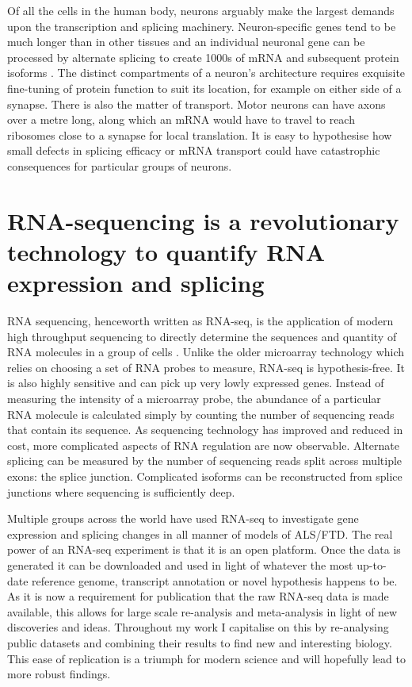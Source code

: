 Of all the cells in the human body, neurons arguably make the largest demands upon the transcription and splicing machinery. Neuron-specific genes tend to be much longer than in other tissues \citep{Sibley2015} and an individual neuronal gene can be processed by alternate splicing to create 1000s of mRNA and subsequent protein isoforms \citep{Treutlein2014}. The distinct compartments of a neuron's architecture requires exquisite fine-tuning of protein function to suit its location, for example on either side of a synapse. There is also the matter of transport. Motor neurons can have axons over a metre long, along which an mRNA would have to travel to reach ribosomes close to a synapse for local translation. It is easy to hypothesise how small defects in splicing efficacy or mRNA transport could have catastrophic consequences for particular groups of neurons. 



\section{RNA-sequencing is a revolutionary technology to quantify RNA expression and splicing} %

RNA sequencing, henceworth written as RNA-seq, is the application of modern high throughput sequencing to directly determine the sequences and quantity of RNA molecules in a group of cells \citep{Wang2009}. Unlike the older microarray technology which relies on choosing a set of RNA probes to measure, RNA-seq is hypothesis-free. It is also highly sensitive and can pick up very lowly expressed genes. Instead of measuring the intensity of a microarray probe, the abundance of a particular RNA molecule is calculated simply by counting the number of sequencing reads that contain its sequence. As sequencing technology has improved and reduced in cost, more complicated aspects of RNA regulation are now observable. Alternate splicing can be measured by the number of sequencing reads split across multiple exons: the splice junction. Complicated isoforms can be reconstructed from splice junctions where sequencing is sufficiently deep.

Multiple groups across the world have used RNA-seq to investigate gene expression and splicing changes in all manner of models of ALS/FTD. 
The real power of an RNA-seq experiment is that it is an open platform. 
Once the data is generated it can be downloaded and used in light of whatever the most up-to-date reference genome, transcript annotation or novel hypothesis happens to be. 
As it is now a requirement for publication that the raw RNA-seq data is made available, this allows for large scale re-analysis and meta-analysis in light of new discoveries and ideas. 
Throughout my work I capitalise on this by re-analysing public datasets and combining their results to find new and interesting biology.
This ease of replication is a triumph for modern science and will hopefully lead to more robust findings.




